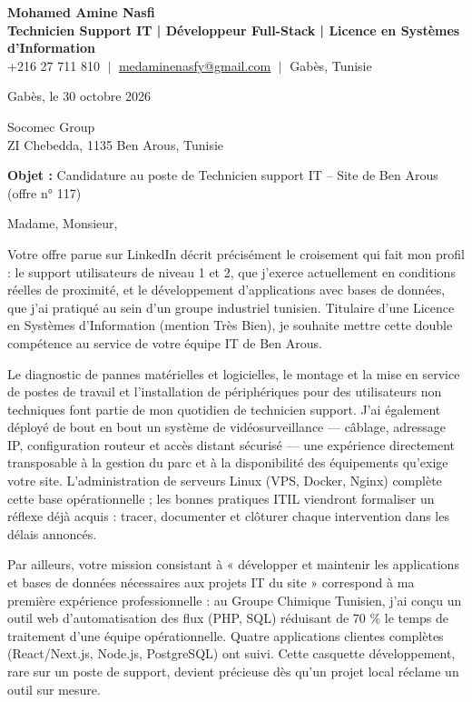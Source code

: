 \documentclass[11pt,a4paper]{article}
\begin{document}
\begin{center}
    \textbf{\Huge \color{navy} Mohamed Amine Nasfi} \\[3pt]
    \small \textbf{\color{accent} Technicien Support IT | Développeur Full-Stack | Licence en Systèmes d'Information} \\[3pt]
    \footnotesize \color{greytext}
    +216 27 711 810 $\;|\;$
    \href{mailto:medaminenasfy@gmail.com}{\underline{medaminenasfy@gmail.com}} $\;|\;$
    Gabès, Tunisie
\end{center}

\vspace{8pt}
\hfill Gabès, le 30 octobre 2026

\vspace{12pt}
Socomec Group \\ ZI Chebedda, 1135 Ben Arous, Tunisie

\vspace{10pt}
\textbf{Objet :} Candidature au poste de Technicien support IT – Site de Ben Arous (offre n° 117)

\vspace{4pt}
Madame, Monsieur,

Votre offre parue sur LinkedIn décrit précisément le croisement qui fait mon profil : le support utilisateurs de niveau 1 et 2, que j'exerce actuellement en conditions réelles de proximité, et le développement d'applications avec bases de données, que j'ai pratiqué au sein d'un groupe industriel tunisien. Titulaire d'une Licence en Systèmes d'Information (mention Très Bien), je souhaite mettre cette double compétence au service de votre équipe IT de Ben Arous.

Le diagnostic de pannes matérielles et logicielles, le montage et la mise en service de postes de travail et l'installation de périphériques pour des utilisateurs non techniques font partie de mon quotidien de technicien support. J'ai également déployé de bout en bout un système de vidéosurveillance — câblage, adressage IP, configuration routeur et accès distant sécurisé — une expérience directement transposable à la gestion du parc et à la disponibilité des équipements qu'exige votre site. L'administration de serveurs Linux (VPS, Docker, Nginx) complète cette base opérationnelle ; les bonnes pratiques ITIL viendront formaliser un réflexe déjà acquis : tracer, documenter et clôturer chaque intervention dans les délais annoncés.

Par ailleurs, votre mission consistant à « développer et maintenir les applications et bases de données nécessaires aux projets IT du site » correspond à ma première expérience professionnelle : au Groupe Chimique Tunisien, j'ai conçu un outil web d'automatisation des flux (PHP, SQL) réduisant de 70 \% le temps de traitement d'une équipe opérationnelle. Quatre applications clientes complètes (React/Next.js, Node.js, PostgreSQL) ont suivi. Cette casquette développement, rare sur un poste de support, devient précieuse dès qu'un projet local réclame un outil sur mesure.
\end{document}
